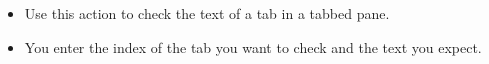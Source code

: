 
\begin{itemize}
\item Use this action to check the text of a tab in a tabbed pane. 
\item You enter the index of the tab you want to check and the text you expect.
\end{itemize}

